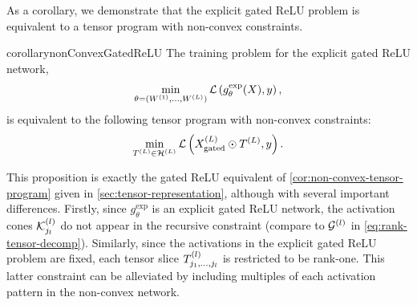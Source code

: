 As a corollary, we demonstrate that the explicit gated ReLU problem
is equivalent to a tensor program with non-convex constraints.

\begin{restatable}{corollary}{nonConvexGatedReLU}\label{cor:non-convex-gated-relu}
    The training problem for the explicit gated ReLU network,
    \begin{equation}\label{eq:explicit-gated-program}
        \min_{\theta = (W^{(1)}, \ldots, W^{(L)})} \mathcal{L}\left(g^{\text{exp}}_{\theta}(X), y\right),
    \end{equation}
    is equivalent to the following tensor program with non-convex
    constraints:
    \begin{equation}\label{eq:non-convex-gated-relu-program}
        \min_{T^{(L)} \in \mathcal{H}^{(L)}} \mathcal{L}\left(X^{(L)}_{\text{gated}} \odot T^{(L)}, y\right).
    \end{equation}
\end{restatable}

This proposition is exactly the gated ReLU equivalent of
\cref{cor:non-convex-tensor-program} given in
\cref{sec:tensor-representation}, although with several
important differences.
Firstly, since \( g^{\text{exp}}_\theta \) is an explicit gated ReLU network,
the activation cones \( \mathcal{K}^{(l)}_{j_l} \) do not appear in the recursive
constraint (compare to \( \mathcal{G}^{(l)} \) in \cref{eq:rank-tensor-decomp}).
Similarly, since the activations in the explicit gated ReLU problem are fixed,
each tensor slice \( T^{(l)}_{j_1, \ldots, j_l} \) is restricted to be rank-one.
This latter constraint can be alleviated by including
multiples of each activation pattern in the non-convex network.

